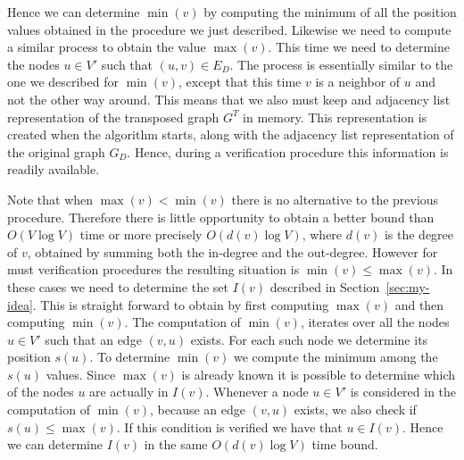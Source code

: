 \documentclass[a4paper]{article}
\begin{document}
Hence we can determine $\min(v)$ by computing the minimum of all the
position values obtained in the procedure we just described. Likewise we
need to compute a similar process to obtain the value $\max(v)$. This time
we need to determine the nodes $u \in V'$ such that $(u, v) \in E_D$. The
process is essentially similar to the one we described for $\min(v)$,
except that this time $v$ is a neighbor of $u$ and not the other way
around. This means that we also must keep and adjacency list representation
of the transposed graph $G^T$ in memory. This representation is created
when the algorithm starts, along with the adjacency list representation of
the original graph $G_D$. Hence, during a verification procedure this
information is readily available.

Note that when $\max(v) < \min(v)$ there is no alternative to the previous
procedure. Therefore there is little opportunity to obtain a better bound
than $O(V \log V)$ time or more precisely $O(d(v) \log V)$, where $d(v)$ is
the degree of $v$, obtained by summing both the in-degree and the
out-degree. However for must verification procedures the resulting
situation is $\min(v) \leq \max(v)$. In these cases we need to determine
the set $I(v)$ described in Section~\ref{sec:my-idea}. This is straight
forward to obtain by first computing $\max(v)$ and then computing
$\min(v)$. The computation of $\min(v)$, iterates over all the nodes
$u \in V'$ such that an edge $(v, u)$ exists. For each such node we
determine its position $s(u)$. To determine $\min(v)$ we compute the
minimum among the $s(u)$ values. Since $\max(v)$ is already known it is
possible to determine which of the nodes $u$ are actually in
$I(v)$. Whenever a node $u \in V'$ is considered in the computation of
$\min(v)$, because an edge $(v, u)$ exists, we also check if
$s(u) \leq \max(v)$. If this condition is verified we have that
$u \in I(v)$. Hence we can determine $I(v)$ in the same $O(d(v) \log V)$
time bound.
\end{document}
